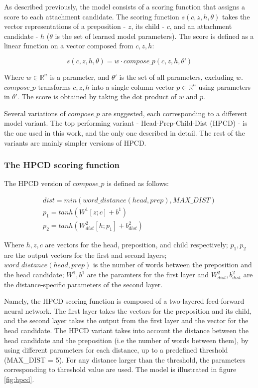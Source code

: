 As described previously, the model consists of a scoring function that assigns a score to each attachment candidate. The scoring function $s(c, z, h, \theta)$ takes the vector representations of a preposition  - $z$, its child - $c$, and an attachment candidate - $h$ ($\theta$ is the set of learned model parameters). The score is defined as a linear function on a vector composed from $c, z, h$:

$$s(c,z,h,\theta) = w \cdot compose\_p(c,z,h, \theta’)$$

Where $w \in \mathbb{R}^n$ is a parameter, and $\theta'$ is the set of all parameters, excluding $w$. $compose\_p$ transforms $c, z, h$ into a single column vector $p \in \mathbb{R}^n$ using parameters in $\theta’$.  The score is obtained by taking the dot product of $w$ and $p$. 

Several variations of $compose\_p$ are suggested, each corresponding to a different model variant. The top performing variant - Head-Prep-Child-Dist (HPCD) - is the one used in this work, and the only one described in detail. The rest of the variants are mainly simpler versions of HPCD.

\subsubsection{The HPCD scoring function}
The HPCD version of $compose\_p$ is defined as follows:

\begin{equation}
\begin{gathered}  
   dist = min(word\_distance(head, prep), MAX\_DIST)  \\
   p_1 = tanh(W^1[z;c] + b^1)   \\
   p_2 = tanh(W^2_{dist}[h;p_1] + b^2_{dist})     
\end{gathered}\label{eq:hpcd}
\end{equation}

Where $h, z, c$ are vectors for the head, preposition, and child respectively; $p_1, p_2$ are the output vectors for the first and second layers;
$word\_distance(head, prep)$ is the number of words between the preposition and the head candidate; $ W^1, b^1$ are the paramters for the first layer and $W^2_{dist}, b^2_{dist}$ are the distance-specific parameters of the second layer.

Namely, the HPCD scoring function is composed of a two-layered feed-forward neural network. The first layer takes the vectors for the preposition and its child, and the second layer takes the output from the first layer and the vector for the head candidate. The HPCD variant takes into account the distance between the head candidate and the preposition (i.e the number of words between them), by using different parameters for each distance, up to a predefined threshold (MAX\_DIST = 5). For any distance larger than the threshold, the parameters corresponding to threshold value are used. The model is illustrated in figure \ref{fig:hpcd}.

